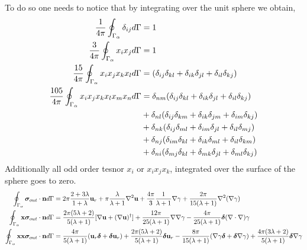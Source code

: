 To do so one needs to notice that by integrating over the unit sphere we obtain, 
\begin{align*}
    \frac{1}{4\pi}\oint_{\Gamma_{\alpha}} \delta_{ij} d\Gamma &=1\\
    \frac{3}{4\pi}\oint_{\Gamma_{\alpha}} x_ix_j d\Gamma &= 1\\
    \frac{15}{4\pi}\oint_{\Gamma_{\alpha}} x_ix_jx_kx_l d\Gamma &= (\delta_{ij}\delta_{kl} + \delta_{ik}\delta_{jl} + \delta_{il}\delta_{kj}) \\
    \frac{105}{4\pi}\oint_{\Gamma_{\alpha}} x_ix_jx_kx_lx_mx_n d\Gamma 
    &= 
    \delta_{nm}(
        \delta_{ij}\delta_{kl} 
        + \delta_{ik}\delta_{jl} 
        + \delta_{il}\delta_{kj}
        ) \\
    &+ 
    \delta_{nl}(
        \delta_{ij}\delta_{km} 
        + \delta_{ik}\delta_{jm} 
        + \delta_{im}\delta_{kj}
        ) \\
    &+ 
    \delta_{nk}(
        \delta_{ij}\delta_{ml} 
        + \delta_{im}\delta_{jl} 
        + \delta_{il}\delta_{mj}
        ) \\
    &+ 
    \delta_{nj}(
        \delta_{im}\delta_{kl} 
        + \delta_{ik}\delta_{ml} 
        + \delta_{il}\delta_{km}
        ) \\
    &+ 
    \delta_{ni}(
        \delta_{mj}\delta_{kl} 
        + \delta_{mk}\delta_{jl} 
        + \delta_{ml}\delta_{kj}
        ) \\
\end{align*}
Additionally all odd order tesnor $x_i$ or $x_ix_jx_k$, integrated over the surface of the sphere goes to zero. 
\begin{align*}
    \oint_{\Gamma_{\alpha}} \bm\sigma_{out}\cdot \textbf{n} d\Gamma &
    =
    2\pi\frac{2+3\lambda}{1+\lambda}\textbf{u}_r
    + \pi \frac{\lambda}{\lambda +1} \mathbf{\nabla}^2 \textbf{u}
    +
    \frac{4\pi}{3}\frac{1}{\lambda +1}\mathbf{\nabla} \gamma
    + \frac{2\pi}{15(\lambda +1)}\mathbf{\nabla}^2(\mathbf{\nabla}\gamma)
    \\
    \oint_{\Gamma_{\alpha}}  \textbf{x}\bm\sigma_{out}\cdot \textbf{n} d\Gamma &
    =
    \frac{2\pi(5\lambda +2)}{5(\lambda +1)}[\mathbf{\nabla} \textbf{u}+ (\mathbf{\nabla} \textbf{u})^\dagger]
    + \frac{12\pi}{25(\lambda +1)}\mathbf{\nabla}\mathbf{\nabla} \gamma
    - \frac{4\pi}{25(\lambda +1)}\bm\delta(\mathbf{\nabla}\cdot\mathbf{\nabla}) \gamma
    \\
    \oint_{\Gamma_{\alpha}} \textbf{xx}\bm\sigma_{out}\cdot \textbf{n} d\Gamma &
    =
    \frac{4\pi}{5(\lambda +1)} (\textbf{u}_r \bm\delta + \bm\delta \textbf{u}_r)
    + \frac{2\pi(5\lambda +2)}{5(\lambda+1)}\bm\delta \textbf{u}_r
    - \frac{8\pi}{15(\lambda +1)} (\mathbf{\nabla} \gamma \bm\delta + \bm\delta \mathbf{\nabla} \gamma)
    + \frac{4\pi(3\lambda +2)}{5(\lambda+1)}\bm\delta \mathbf{\nabla} \gamma
    \\
\end{align*}

